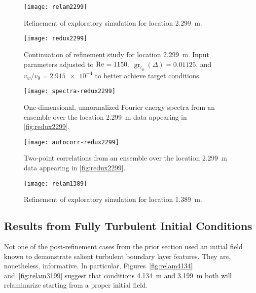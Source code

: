 \begin{figure}
\centering\texttt{[image: relam2299]}
\caption{Refinement of exploratory simulation for location 2.299~m.\label{fig:relam2299}}
\end{figure}

\begin{figure}
\centering\texttt{[image: redux2299]}
\caption[Continuation of refinement study for location 2.299~m.]
        {Continuation of refinement study for location 2.299~m.
         Input parameters adjusted to $\mbox{Re}_{}=1150$,
         $\operatorname{gr}_{t_0}\!\left(\Delta\right)=0.01125$,
         and $v_w/v_0=\num{2.915e-4}$ to better achieve target
         conditions.\label{fig:redux2299}}
\end{figure}


\begin{figure}
\centering
\texttt{[image: spectra-redux2299]}
\caption{%
    One-dimensional, unnormalized Fourier energy spectra from an ensemble
    over the location 2.299~m data appearing in
    \autoref{fig:redux2299}.\label{fig:spectra-redux2299}
}
\end{figure}

\begin{figure}
\centering
\texttt{[image: autocorr-redux2299]}
\caption{%
    Two-point correlations from an ensemble over the location 2.299~m data
    appearing in \autoref{fig:redux2299}.\label{fig:autocorr-redux2299}
}
\end{figure}

\begin{figure}
\centering\texttt{[image: relam1389]}
\caption{Refinement of exploratory simulation for location 1.389~m.\label{fig:relam1389}}
\end{figure}


\clearpage
\subsection{Results from Fully Turbulent Initial Conditions}
\label{sec:relam_results_turb}

Not one of the post-refinement cases from the prior section used an
initial field known to demonstrate salient turbulent boundary layer
features.  They are, nonetheless, informative.  In particular,
Figures~\ref{fig:relam4134} and~\ref{fig:relam3199} suggest that conditions
4.134~m and 3.199~m both will relaminarize starting from a proper initial field.

